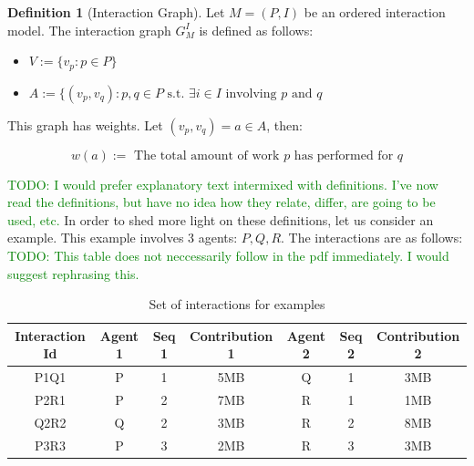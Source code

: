 \documentclass[a4paper,11pt]{book}
\newcommand\suggestion[1]{\textcolor{green}{TODO: #1}}
\theoremstyle{definition}
\newtheorem{definition}{Definition}
\begin{document}
\begin{definition}[Interaction Graph]
    Let $M = (P, I)$ be an ordered interaction model. The interaction graph $G^I_M$ is defined as follows:

    \begin{itemize}
        \item $V := \{ v_p : p \in P \}$\\
        \item $A := \{ (v_p, v_q) : p, q \in P \mbox{ s.t. } \exists i \in I \mbox{ involving } p \mbox{ and } q$ \\
    \end{itemize}

    This graph has weights. Let $(v_{p}, v_q) = a \in A$, then:

    \begin{equation*}
        w(a) := \mbox{ The total amount of work } p \mbox{ has performed for } q
    \end{equation*}
\end{definition}

\suggestion{I would prefer explanatory text intermixed with definitions. I've now read the definitions, but have no idea
how they relate, differ, are going to be used, etc.}
In order to shed more light on these definitions, let us consider an example. This example involves
3 agents: $P, Q, R$. The interactions are as follows: \suggestion{This table does not neccessarily follow in the pdf
immediately. I would suggest rephrasing this.}

\begin{table}[h]
    \centering
    \begin{tabular}{c|c|c|c|c|c|c}
        Interaction Id & Agent 1 & Seq 1 & Contribution 1 & Agent 2 & Seq 2 & Contribution 2 \\\hline
        P1Q1           & P       & 1                 & 5MB            & Q       & 1                 & 3MB            \\
        P2R1           & P       & 2                 & 7MB            & R       & 1                 & 1MB            \\
        Q2R2           & Q       & 2                 & 3MB            & R       & 2                 & 8MB            \\
        P3R3           & P       & 3                 & 2MB            & R       & 3                 & 3MB            \\
    \end{tabular}
    \caption{Set of interactions for examples}
    \label{tab:interactions}
\end{table}
\end{document}
